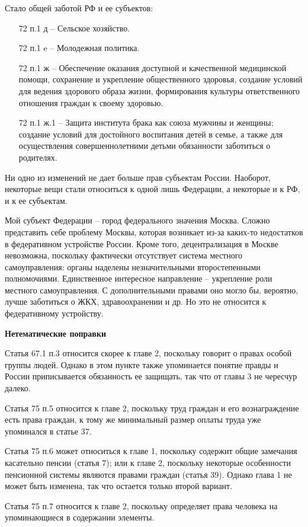 \documentclass[a4paper, 12pt]{article}
\begin{document}
Стало общей заботой РФ и ее субъектов:
\begin{itemize}
\item[72 п.1 д --] Сельское хозяйство. 
\item[72 п.1 e --] Молодежная политика. 
\item[72 п.1 ж --] Обеспечение оказания доступной и качественной медицинской помощи, сохранение и укрепление общественного здоровья, создание условий для ведения здорового образа жизни, формирования культуры ответственного отношения граждан к своему здоровью. 
\item[72 п.1 ж.1 --] Защита института брака как союза мужчины и женщины; создание условий для достойного воспитания детей в семье, а также для осуществления совершеннолетними детьми обязанности заботиться о родителях. 
\end{itemize}

Ни одно из изменений не дает больше прав субъектам России. Наоборот, некоторые вещи стали относиться к одной лишь Федерации, а некоторые и к РФ, и к ее субъектам. 

Мой субъект Федерации -- город федерального значения Москва. Сложно представить себе проблему Москвы, которая возникает из-за каких-то недостатков в федеративном устройстве России. Кроме того, децентрализация в Москве невозможна, поскольку фактически отсутствует система местного самоуправления: органы наделены незначительными второстепенными полномочиями. Единственное интересное направление -- укрепление роли местного самоуправления. С дополнительными правами оно могло бы, вероятно, лучше заботиться о ЖКХ, здравоохранении и др. Но это не относится к федеративному устройству. 





\newpage
\begin{center}\bf
Нетематические поправки 
\end{center}

Статья 67.1 п.3 относится скорее к главе 2, поскольку говорит о правах особой группы людей. Однако в этом пункте также упоминается понятие правды и России приписывается обязанность ее защищать, так что от главы 3 не чересчур далеко. 

Статья 75 п.5 относится к главе 2, поскольку труд граждан и его вознаграждение есть права граждан, к тому же минимальный размер оплаты труда уже упоминался в статье 37. 

Статья 75 п.6 может относиться к главе 1, поскольку содержит общие замечания касательно пенсии (статья 7); или к главе 2, поскольку некоторые особенности пенсионной системы являются правами граждан (статья 39). Однако глава 1 не может быть изменена, так что остается только второй вариант. 

Статья 75 п.7 относится к главе 2, поскольку определяет права человека на упоминающиеся в содержании элементы. 
\end{document}
